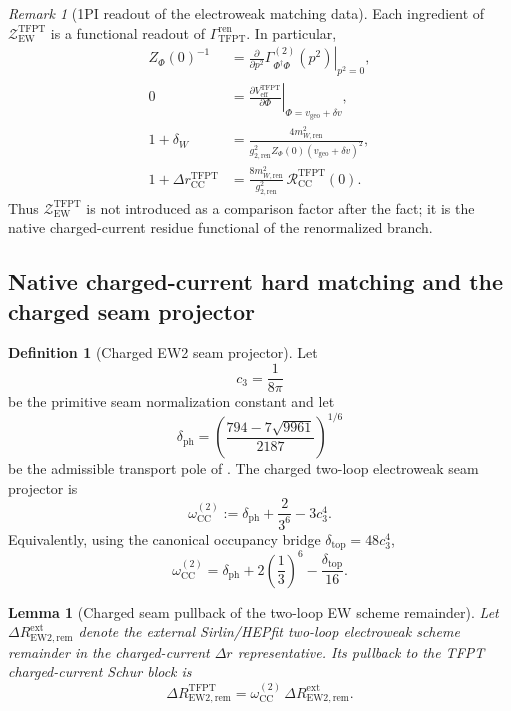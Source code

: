 \documentclass[11pt,a4paper]{article}
\newtheorem{lemma}[theorem]{Lemma}
\theoremstyle{definition}
\newtheorem{definition}[theorem]{Definition}
\theoremstyle{remark}
\newtheorem*{remark}{Remark}
\newcommand{\cthree}{c_3}
\newcommand{\deltatop}{\delta_{\mathrm{top}}}
\newcommand{\omegaCCEW}{\omega_{\mathrm{CC}}^{(2)}}
\newcommand{\vgeo}{v_{\mathrm{geo}}}
\begin{document}
\begin{remark}[1PI readout of the electroweak matching data]
Each ingredient of $\mathcal Z_{\mathrm{EW}}^{\mathrm{TFPT}}$ is a functional readout of
$\Gamma_{\mathrm{TFPT}}^{\mathrm{ren}}$. In particular,
\[
\begin{aligned}
Z_\Phi(0)^{-1}
&=
\left.\frac{\partial}{\partial p^2}\Gamma_{\Phi^\dagger\Phi}^{(2)}(p^2)\right|_{p^2=0},
\\
0
&=
\left.\frac{\partial V_{\mathrm{eff}}^{\mathrm{TFPT}}}{\partial \Phi}\right|_{\Phi=\vgeo+\delta v},
\\
1+\delta_W
&=
\frac{4m_{W,\mathrm{ren}}^2}
{g_{2,\mathrm{ren}}^2Z_\Phi(0)(\vgeo+\delta v)^2},
\\
1+\Delta r_{\mathrm{CC}}^{\mathrm{TFPT}}
&=
\frac{8m_{W,\mathrm{ren}}^2}{g_{2,\mathrm{ren}}^2}\,
\mathcal R_{\mathrm{CC}}^{\mathrm{TFPT}}(0).
\end{aligned}
\]
Thus $\mathcal Z_{\mathrm{EW}}^{\mathrm{TFPT}}$ is not introduced as a comparison factor after the
fact; it is the native charged-current residue functional of the renormalized branch.
\end{remark}


\subsection{Native charged-current hard matching and the charged seam projector}

\begin{definition}[Charged EW2 seam projector]
\label{def:charged-ew2-seam-projector}
Let
\[
\cthree=\frac{1}{8\pi}
\]
be the primitive seam normalization constant and let
\[
\delta_{\mathrm{ph}}
=
\left(
\frac{794-7\sqrt{9961}}{2187}
\right)^{1/6}
\]
be the admissible transport pole of . The charged two-loop
electroweak seam projector is
\begin{equation}
\label{eq:charged-ew2-seam-projector}
\omegaCCEW
:=
\delta_{\mathrm{ph}}
+
\frac{2}{3^6}
-
3\cthree^4.
\end{equation}
Equivalently, using the canonical occupancy bridge $\deltatop=48\cthree^4$,
\[
\omegaCCEW
=
\delta_{\mathrm{ph}}
+
2\left(\frac13\right)^6
-
\frac{\deltatop}{16}.
\]
\end{definition}

\begin{lemma}[Charged seam pullback of the two-loop EW scheme remainder]
\label{lem:charged-seam-projector-ew2}
Let $\Delta R_{\mathrm{EW2},\mathrm{rem}}^{\mathrm{ext}}$ denote the external
Sirlin/HEPfit two-loop electroweak scheme remainder in the charged-current
$\Delta r$ representative. Its pullback to the TFPT charged-current Schur block is
\begin{equation}
\label{eq:charged-seam-ew2-pullback}
\Delta R_{\mathrm{EW2},\mathrm{rem}}^{\mathrm{TFPT}}
=
\omegaCCEW\,
\Delta R_{\mathrm{EW2},\mathrm{rem}}^{\mathrm{ext}}.
\end{equation}
\end{lemma}
\end{document}
